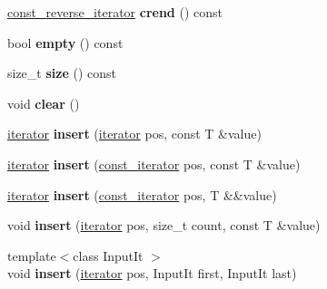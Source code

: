 \begin{DoxyCompactItemize}
\item 
\mbox{\label{classmystl_1_1list_a14053517c61d40b432fbe73c171c0c51}} 
\hyperlink{classmystl_1_1list_1_1const__reverse__iterator}{const\+\_\+reverse\+\_\+iterator} {\bfseries crend} () const
\item 
\mbox{\label{classmystl_1_1list_a9ac4d0803c9508c7a13975456c3b3f56}} 
bool {\bfseries empty} () const
\item 
\mbox{\label{classmystl_1_1list_aa9f3f859978b97ecbb5f2bdf4b56dc55}} 
size\+\_\+t {\bfseries size} () const
\item 
\mbox{\label{classmystl_1_1list_a2d92b8a98d924a3b44a1515cdd6917e2}} 
void {\bfseries clear} ()
\item 
\mbox{\label{classmystl_1_1list_a7187ce427d734683fa5d61d9056d31ff}} 
\hyperlink{classmystl_1_1list_1_1iterator}{iterator} {\bfseries insert} (\hyperlink{classmystl_1_1list_1_1iterator}{iterator} pos, const T \&value)
\item 
\mbox{\label{classmystl_1_1list_affda48e045eea8352c237edb1bce622f}} 
\hyperlink{classmystl_1_1list_1_1iterator}{iterator} {\bfseries insert} (\hyperlink{classmystl_1_1list_1_1const__iterator}{const\+\_\+iterator} pos, const T \&value)
\item 
\mbox{\label{classmystl_1_1list_a1d588745478aa4b0cd4e6a3ee142bdd5}} 
\hyperlink{classmystl_1_1list_1_1iterator}{iterator} {\bfseries insert} (\hyperlink{classmystl_1_1list_1_1const__iterator}{const\+\_\+iterator} pos, T \&\&value)
\item 
\mbox{\label{classmystl_1_1list_ab653ecad8e8f7f4953bd6e3844543717}} 
void {\bfseries insert} (\hyperlink{classmystl_1_1list_1_1iterator}{iterator} pos, size\+\_\+t count, const T \&value)
\item 
\mbox{\label{classmystl_1_1list_a1c657dc84b49dd05d2e58a79adc6f286}} 
{\footnotesize template$<$class Input\+It $>$ }\\void {\bfseries insert} (\hyperlink{classmystl_1_1list_1_1iterator}{iterator} pos, Input\+It first, Input\+It last)

\end{DoxyCompactItemize}
